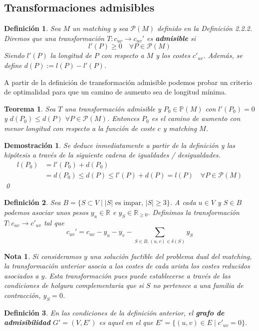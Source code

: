 \documentclass[twoside,a4paper,openright,12pt]{book}
\newtheorem{defi}{Definici\'on}[section]
\newtheorem{nota}{Nota}[section]
\newtheorem{thm}{Teorema}[section]
\newtheorem*{dem}{Demostración}
\newcommand{\R}{\mathbb{R}}
\begin{document}
\subsection{Transformaciones admisibles}
\begin{defi}
Sea $M$ un matching y sea $\mathcal{P}(M)$ definido en la Definición 2.2.2. Diremos que una transformación $T:c_{uv}\to c_{uv}'$  es \textbf{admisible} si
$$
l'(P)\geq 0\quad \forall P \in \mathcal{P}(M)
$$
Siendo $l'(P)$ la longitud de $P$ con respecto a $M$ y los costes $c'_{uv}$. Además, se define $d(P):= l(P)-l'(P)$.
\end{defi}
A partir de la definición de transformación admisible podemos probar un criterio de optimalidad para que un camino de aumento sea de longitud mínima.
\begin{thm}
Sea $T$ una transformación admisible y $P_0 \in \mathbb{P}(M)$ con $l'(P_0) =0$ y 	$d(P_0)\leq d(P)$ $\forall P \in \mathcal{P}(M)$. Entonces $P_0$ es el camino de aumento con menor longitud con respecto a la función de coste $c$ y matching $M$.
\end{thm}
\begin{dem}
Se deduce inmediatamente a partir de la definición y las hipótesis a través de la siguiente cadena de igualdades / desigualdades.
\begin{align*}
l(P_0) &= l'(P_0) + d(P_0)\\
&=d(P_0)\leq d(P) \leq l'(P) + d(P) = l(P)  \quad \forall P \in \mathcal{P}(M)
\end{align*}
\qed
\end{dem}
\begin{defi}
Sea $B=\{S\subset V \mid |S| \text{ es impar, }|S|\geq 3\}$. A cada $u\in V$ y $S\in B$ podemos asociar unos pesos $y_u \in \R$ e $y_S \in \R_{\geq 0}$. Definimos la transformación $T:c_{uv}\to c'_{uv}$ tal que
$$
c_{uv}' =c_{uv}-y_u-y_v - \sum_{S\in B, (u,v)\in \delta(S)}y_S
$$
\end{defi}
\begin{nota}
Si consideramos $y$ una solución factible del problema dual del matching, la transformación anterior asocia a los costes de cada arista los costes reducidos asociados a $y$. Esta transformación pues puede establecerse a través de las condiciones de holgura complementaria que si $S$ no pertenece a una familia de contracción, $y_S =0$.
\end{nota}
\begin{defi}
En las condiciones de la definición anterior, el \textbf{grafo de admisibilidad} $G' = (V,E')$ es aquel en el que $E' = \{(u,v)\in E\mid c'_{uv}=0\}$.
\end{defi}
\end{document}
